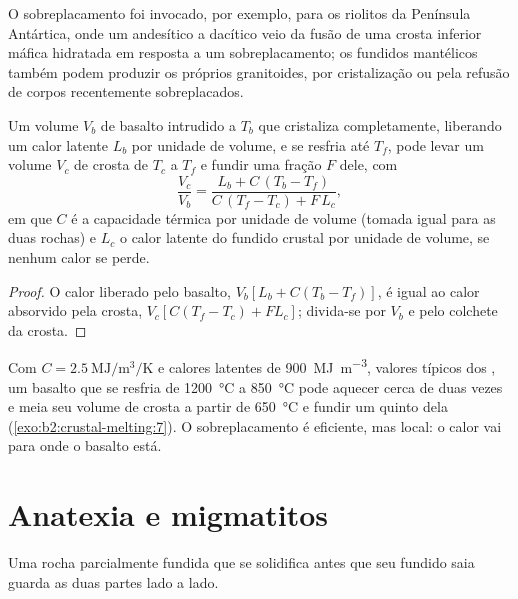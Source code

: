 O sobreplacamento foi invocado, por exemplo, para os riolitos da Península Antártica,
onde um  andesítico a dacítico veio da fusão de uma crosta inferior máfica hidratada em
resposta a um sobreplacamento; os fundidos mantélicos também podem produzir os próprios granitoides,
por cristalização ou pela refusão de corpos recentemente sobreplacados.

\begin{proposition}\label{prop:b2:crustal-melting:heat}
Um volume $V_b$ de basalto intrudido a $T_b$ que cristaliza completamente, liberando um
calor latente $L_b$ por unidade de volume, e se resfria até $T_f$, pode levar um volume $V_c$ de crosta
de $T_c$ a $T_f$ e fundir uma fração $F$ dele, com
\[\frac{V_c}{V_b} = \frac{L_b + C\,(T_b - T_f)}{C\,(T_f - T_c) + F\,L_c},\]
em que $C$ é a capacidade térmica por unidade de volume (tomada igual para as duas rochas) e $L_c$ o
calor latente do fundido crustal por unidade de volume, se nenhum calor se perde.
\end{proposition}

\begin{proof}
O calor liberado pelo basalto, $V_b[L_b + C(T_b - T_f)]$, é igual ao calor absorvido pela
crosta, $V_c[C(T_f - T_c) + F L_c]$; divida-se por $V_b$ e pelo colchete da crosta.
\end{proof}

Com $C = \qty{2.5}{\mega\joule\per\cubic\metre\per\kelvin}$ e calores latentes de
\qty{900}{\mega\joule\per\cubic\metre}, valores típicos dos , um basalto que se resfria de
\qty{1200}{\celsius} a \qty{850}{\celsius} pode aquecer cerca de duas vezes e meia seu volume
de crosta a partir de \qty{650}{\celsius} e fundir um quinto dela (\cref{exo:b2:crustal-melting:7}).
O sobreplacamento é eficiente, mas local: o calor vai para onde o basalto está.

\section{Anatexia e migmatitos}\label{sec:b2:crustal-melting:migmatites}

Uma rocha parcialmente fundida que se solidifica antes que seu fundido saia guarda as duas partes lado a lado.


